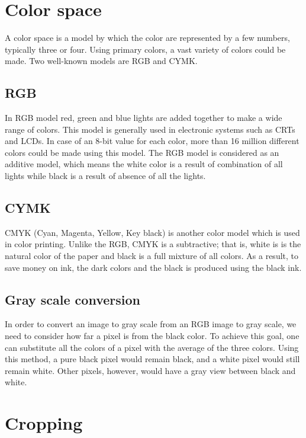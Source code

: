\documentclass{article}
\begin{document}
\section{Color space}    
	A color space is a model by which the color are represented by a few numbers, typically three or four. Using primary colors, a vast variety of colors could be made. Two well-known models are RGB and CYMK.      

	\subsection{RGB}
		In RGB model red, green and blue lights are added together to make a wide range of colors. This model is generally used in electronic systems such as CRTs and LCDs. In case of an 8-bit value for each color, more than 16 million different colors
		could be made using this model. The RGB model is considered as an additive model, which means the white color is a result of combination of all lights while black is a result of absence of all the lights.
	

	\subsection{CYMK}

		CMYK (Cyan, Magenta, Yellow, Key black) is another color model which is used in color printing. Unlike the RGB, CMYK is a subtractive; that is, white is is the natural color of the paper and black is a full mixture of all colors.
		As a result, to save money on ink, the dark colors and the black is produced using the black ink.

	\subsection{Gray scale conversion}

		In order to convert an image to gray scale from an RGB image to gray scale, we need to consider how far a pixel is from the black color. To achieve this goal, one can substitute all the colors of a pixel with the average of the three colors. Using this method, a pure black pixel would remain black, and a white pixel would still remain white. Other pixels, however, would have a gray view between black and white.

\section{Cropping}
\end{document}
